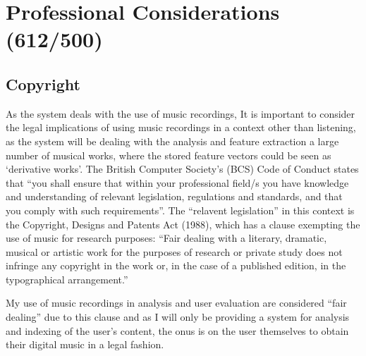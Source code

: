 \section{Professional Considerations (612/500)}

\subsection{Copyright}
As the system deals with the use of music recordings, 
It is important to consider the legal implications of using music recordings in a context other than listening, as the system will be dealing with the analysis and feature extraction a large number of musical works, where the stored feature vectors could be seen as `derivative works'. The British Computer Society's (BCS) Code of Conduct states that ``you shall ensure that within your professional field/s you have knowledge and understanding of relevant legislation, regulations and standards, and that you comply with such requirements''. The ``relavent legislation'' in this context is the Copyright, Designs and Patents Act (1988), which has a clause exempting the use of music for research purposes: ``Fair dealing with a literary, dramatic, musical or artistic work for the purposes of research or private study does not infringe any copyright in the work or, in the case of a published edition, in the typographical arrangement.''

My use of music recordings in analysis and user evaluation are considered ``fair dealing'' due to this clause and as I
will only be providing a system for analysis and indexing of the user's content,
the onus is on the user themselves to obtain their digital music in a legal fashion.


